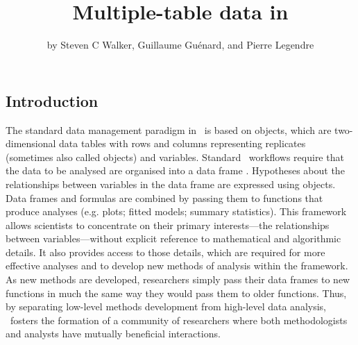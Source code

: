 \documentclass[a4paper]{report}
\numberwithin{exercise}{section}
\begin{document}
\begin{article}
\title{Multiple-table data in \R}
\author{by Steven C Walker, Guillaume Gu\'{e}nard, and Pierre Legendre}
\maketitle

 





\section{Introduction}

The standard data management paradigm in \R\ is based on  objects, which are two-dimensional data tables with rows and columns representing replicates (sometimes also called objects) and variables.  Standard \R\ workflows require that the data to be analysed are organised into a data frame \citep{ChambersAndHastie1992}.  Hypotheses about the relationships between variables in the data frame are expressed using  objects.  Data frames and formulas are combined by passing them to functions that produce analyses (e.g. plots; fitted models; summary statistics).  This framework allows scientists to concentrate on their primary interests---the relationships between variables---without explicit reference to mathematical and algorithmic details.  It also provides access to those details, which are required for more effective analyses and to develop new methods of analysis within the framework.  As new methods are developed, researchers simply pass their data frames to new functions in much the same way they would pass them to older functions.  Thus, by separating low-level methods development from high-level data analysis, \R\ fosters the formation of a community of researchers where both methodologists and analysts have mutually beneficial interactions.


\end{article}
\end{document}
